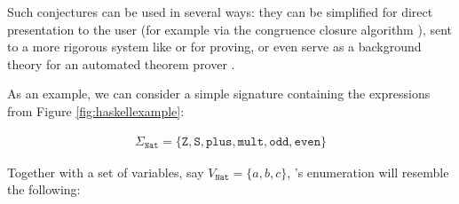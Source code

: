 \iffalse
\begin{enumerate}
\item Given a typed signature $\Sigma$ and set of variables $V$, \qspec{}
  generates a list $terms$ containing the constants (including functions) from
  $\Sigma$, the variables from $V$ and type-correct function applications
  \hs{f x}, where \hs{f} and \hs{x} are elements of $terms$. To ensure the list
  is finite, function applications are only nested up to a specified depth (by
  default, 3).
\item The elements of $terms$ are grouped into equivalence classes, based on
  their type.
\item The equivalence of terms in each class is tested using \qcheck{}:
  variables are instantiated to particular values, generated randomly, and the
  resulting closed expressions are evaluated and compared for equality.
\item If a class is found to have non-equal members, it is split up to separate
  those members.
\item The previous steps of testing and splitting are repeated until the classes
  stabilise (i.e. no differences have been observed for some specified number of
  repetitions).
\item For each class, one member is selected and equations are conjectured that
  it is equal to each of the other members.
\item A congruence closure algorithm is applied to these equations, to discard
  any which are implied by the others.
\end{enumerate}
\fi

Such conjectures can be used in several ways: they can be simplified for direct
presentation to the user (for example via the congruence closure algorithm
\iffalse\cite{TODO}\fi), sent to a more rigorous system like \hspec{} or
\hipster{} for proving, or even serve as a background theory for an
automated theorem prover \cite{claessen2013automating}.

As an example, we can consider a simple signature containing the expressions
from Figure \ref{fig:haskellexample}:

\begin{align*}
  \Sigma_{\texttt{Nat}} = \{\texttt{Z}, \texttt{S}, \texttt{plus}, \texttt{mult}, \texttt{odd}, \texttt{even}\}
\end{align*}

Together with a set of variables, say $V_{\texttt{Nat}} = \{a, b, c\}$,
\qspec{}'s enumeration will resemble the following:

